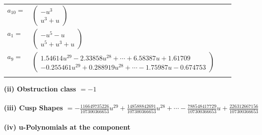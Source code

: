 \documentclass[1p]{elsarticle_modified}
\theoremstyle{definition}
\begin{document}
\begin{tabular}{m{7pt} m{180pt} m{7pt} m{180pt} }
\flushright $a_{10}=$&$\begin{pmatrix}- u^3\\u^3+u\end{pmatrix}$ \\
\flushright $a_{1}=$&$\begin{pmatrix}- u^5- u\\u^5+u^3+u\end{pmatrix}$ \\
\flushright $a_{9}=$&$\begin{pmatrix}1.54614 u^{29}-2.33858 u^{28}+\cdots+6.58387 u+1.61709\\-0.255461 u^{29}+0.288919 u^{28}+\cdots-1.75987 u-0.674753\end{pmatrix}$\\&\end{tabular}
\flushleft \textbf{(ii) Obstruction class $= -1$}\\~\\
\flushleft \textbf{(iii) Cusp Shapes $= -\frac{116649735226}{107300366653} u^{29}+\frac{148588842691}{107300366653} u^{28}+\cdots-\frac{788548417729}{107300366653} u+\frac{226312667156}{107300366653}$}\\~\\
\newpage\renewcommand{\arraystretch}{1}
\flushleft \textbf{(iv) u-Polynomials at the component}\newline \\
\end{document}
